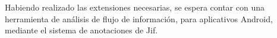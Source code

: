 Habiendo realizado las extensiones necesarias, se espera contar
con una herramienta de análisis de flujo de información, para aplicativos Android,
mediante el sistema de anotaciones de Jif.



